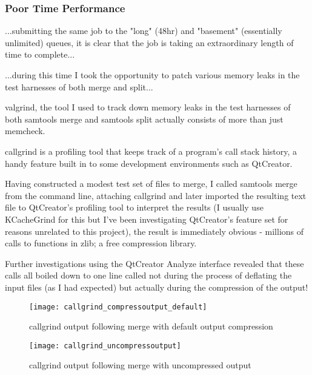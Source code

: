 \subsubsection{Poor Time Performance}
...submitting the same job to the "long" (48hr) and "basement" (essentially
unlimited) queues, it is clear that the job is taking an extraordinary length of
time to complete...

...during this time I took the opportunity to patch various memory leaks in the
test harnesses of both merge and split...

valgrind, the tool I used to track down memory leaks in the test harnesses of
both samtools merge and samtools split actually consists of more than just
memcheck.

callgrind is a profiling tool that keeps track of a program’s call stack
history, a handy feature built in to some development environments such as
QtCreator.

Having constructed a modest test set of files to merge, I called samtools merge
from the command line, attaching callgrind and later imported the resulting
text file to QtCreator’s profiling tool to interpret the results (I usually use
KCacheGrind for this but I’ve been investigating QtCreator’s feature set for
reasons unrelated to this project), the result is immediately obvious -
millions of calls to functions in zlib; a free compression library.

Further investigations using the QtCreator Analyze interface revealed that
these calls all boiled down to one line called not during the process of
deflating the input files (as I had expected) but actually during the
compression of the output!

\begin{figure}[htbp!]
    \centering
    \texttt{[image: callgrind\_compressoutput\_default]}
    \caption[callgrind-default]{callgrind output following merge with default
    output compression}
    \label{fig:callgrind-default}
\end{figure}

\begin{figure}[htbp!]
    \centering
    \texttt{[image: callgrind\_uncompressoutput]}
    \caption[callgrind-uncompressed]{callgrind output following merge with
    uncompressed output}
    \label{fig:callgrind-uncompressed}
\end{figure}

